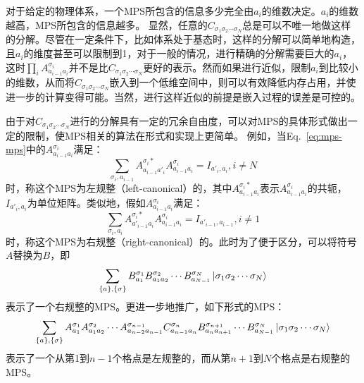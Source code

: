 \documentclass{article}
\begin{document}
对于给定的物理体系，一个MPS所包含的信息多少完全由$a_i$的维数决定。$a_i$的维数越高，MPS所包含的信息越多。
显然，任意的$C_{\sigma_1\sigma_2\cdots\sigma_N }$总是可以不唯一地做这样的分解。尽管在一定条件下，比如体系处于基态时，这样的分解可以简单地构造，且$a_i$的维度甚至可以限制到1，对于一般的情况，进行精确的分解需要巨大的$a_i$，这时$\prod_{i} A^{\sigma_i}_{a_{i-1}a_{i}}$并不是比$C_{\sigma_1\sigma_2\cdots\sigma_N }$更好的表示。然而如果进行近似，限制$a_i$到比较小的维数，从而将$C_{\sigma_1\sigma_2\cdots\sigma_N }$嵌入到一个低维空间中，则可以有效降低内存占用，并使进一步的计算变得可能。当然，进行这样近似的前提是嵌入过程的误差是可控的。

由于对$C_{\sigma_1\sigma_2\cdots\sigma_N }$进行的分解具有一定的冗余自由度，可以对MPS的具体形式做出一定的限制，使MPS相关的算法在形式和实现上更简单。
例如，当Eq.~\ref{eq:mps-mps}中的$A^{\sigma_i}_{a_{i-1}a_{i}}$满足：
\begin{equation}
\label{eq:left-cano}
    \sum_{\sigma_i, a_{i-1}}A^{\sigma_i*}_{a_{i-1}a'_{i}} A^{\sigma_i}_{a_{i-1}a_{i}} = I_{a'_i, a_i}, i \neq N
\end{equation}
时，称这个MPS为左规整（left-canonical）的，其中$A^{\sigma_i*}_{a_{i-1}a_{i}}$表示$A^{\sigma_i}_{a_{i-1}a_{i}}$的共轭，$I_{a'_i, a_i}$为单位矩阵。类似地，假如$A^{\sigma_i}_{a_{i-1}a_{i}}$满足：
\begin{equation}
    \sum_{\sigma_i, a_{i}}A^{\sigma_i*}_{a'_{i-1}a_{i}} A^{\sigma_i}_{a_{i-1}a_{i}} = I_{a'_{i-1}, a_{i-1}}, i \neq 1
\end{equation}
时，称这个MPS为右规整（right-canonical）的。此时为了便于区分，可以将符号$A$替换为$B$，即
$$
\sum_{\{a\},\{\sigma\}}
     B^{\sigma_1}_{a_1} B^{\sigma_2}_{a_1a_2} \cdots
           B^{\sigma_N}_{a_{N-1}}  \ket{ \sigma_1\sigma_2\cdots\sigma_N }
$$
表示了一个右规整的MPS。更进一步地推广，如下形式的MPS：
\begin{equation}
\sum_{\{a\},\{\sigma\}}
     A^{\sigma_1}_{a_1} A^{\sigma_2}_{a_1a_2} \cdots A^{\sigma_{n-1}}_{a_{n-2}a_{n-1}}C^{\sigma_n}_{a_{n-1}a_n}
     B^{\sigma_{n+1}}_{a_n a_{n+1}} \cdots
           B^{\sigma_N}_{a_{N-1}}  \ket{ \sigma_1\sigma_2\cdots\sigma_N }
\end{equation}
表示了一个从第1到$n-1$个格点是左规整的，而从第$n+1$到$N$个格点是右规整的MPS。
\end{document}

